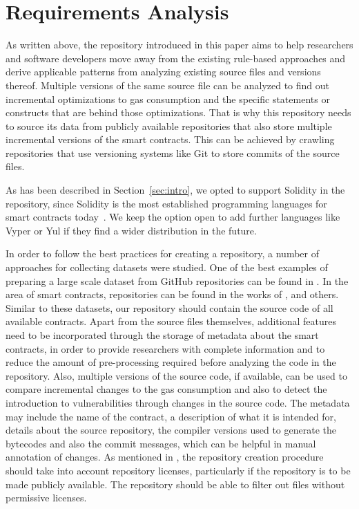 \documentclass[10pt,conference]{IEEEtran}
\begin{document}
	\section{Requirements Analysis}
	\label{sec:requirements}
	As written above, the repository introduced in this paper aims to help researchers and software developers move away from the existing rule-based approaches and derive applicable patterns from analyzing existing source files and versions thereof. Multiple versions of the same source file can be analyzed to find out incremental optimizations to gas consumption and the specific statements or constructs that are behind those optimizations. That is why this repository needs to source its data from publicly available repositories that also store multiple incremental versions of the smart contracts. This can be achieved by crawling repositories that use versioning systems like Git to store commits of the source files.  
	
	As has been described in Section~\ref{sec:intro}, we opted to support Solidity in the repository, since Solidity is the most established programming languages for smart contracts today~\cite{soliditycheck}. We keep the option open to add further languages like Vyper or Yul if they find a wider distribution in the future. 
	
	In order to follow the best practices for creating a repository, a number of approaches for collecting datasets were studied. One of the best examples of preparing a large scale dataset from GitHub repositories can be found in \cite{thestack}. In the area of smart contracts, repositories can be found in the works of \cite{ren}, \cite{ferreirarepo} and others. Similar to these datasets, our repository should contain the source code of all available contracts. Apart from the source files themselves, additional features need to be incorporated through the storage of metadata about the smart contracts, in order to provide researchers with complete information and to reduce the amount of pre-processing required before analyzing the code in the repository. Also, multiple versions of the source code, if available, can be used to compare incremental changes to the gas consumption and also to detect the introduction to vulnerabilities through changes in the source code. The metadata may include the name of the contract, a description of what it is intended for, details about the source repository, the compiler versions used to generate the bytecodes and also the commit messages, which can be helpful in manual annotation of changes. As mentioned in \cite{thestack}, the repository creation procedure should take into account repository licenses, particularly if the repository is to be made publicly available. The repository should be able to filter out files without permissive licenses.
	
\end{document}
